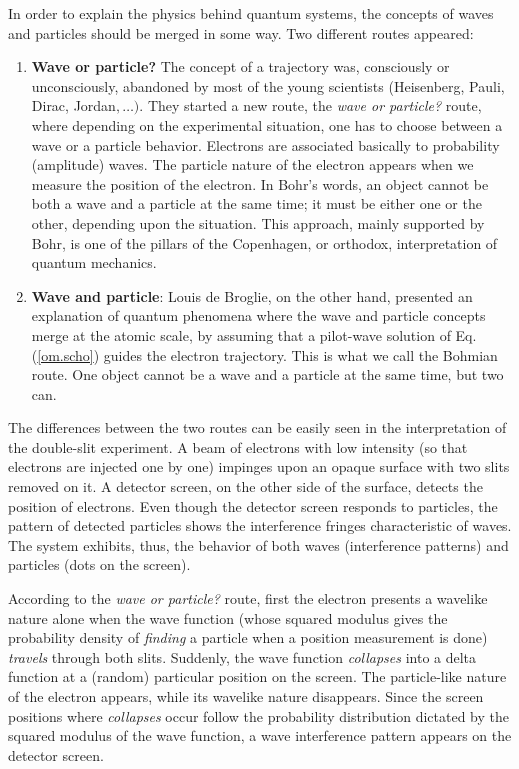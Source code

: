 \documentclass[nofootinbib, secnumarabic, amsmath, nobibnotes,11pt,aps,pra, floatfix]{revtex4-1}
\newcommand{\eref}[1]{Eq. (\ref{#1})}
\begin{document}
In order to  explain the
physics behind quantum systems, the concepts of waves and particles
should be merged in some way. Two different routes appeared:
\begin{enumerate}
\item \textbf{Wave or particle?} The concept of a trajectory was, consciously or unconsciously, abandoned by most of the young scientists (Heisenberg, Pauli, Dirac, Jordan$,\ldots).$ They started a new route, the \textit{wave or particle?} route, where depending on the experimental situation, one has to choose between a wave or a particle behavior. Electrons are associated basically to probability (amplitude) waves. The particle nature of the electron appears when we measure the position of the electron. In Bohr's words, an object cannot be both a wave and a particle at the same time; it must be either one or the other, depending upon the situation. This approach, mainly supported by Bohr, is one of the pillars of the Copenhagen, or orthodox, interpretation of quantum mechanics.

\item \textbf{Wave and particle}: Louis de Broglie, on the other hand, presented an explanation of quantum phenomena where the wave and particle concepts merge at the atomic scale, by assuming that a pilot-wave solution of \eref{om.scho} guides the electron trajectory. This is what we call the Bohmian route. One object cannot be a wave and a particle at the same time, but two can.
\end{enumerate}

The differences between the two routes can be easily seen in the
interpretation of the double-slit experiment. A beam of electrons
with low intensity (so that electrons are injected one by one)
impinges upon an opaque surface with two slits removed on it. A
detector screen, on the other side of the surface, detects the
position of electrons. Even though the detector screen responds to
particles, the pattern of detected particles shows the interference
fringes characteristic of waves. The system exhibits, thus, the
behavior of both waves (interference patterns) and particles (dots
on the screen).

According to the \textit{wave or particle?} route, first the electron presents a wavelike nature alone when the wave function (whose squared modulus gives the probability density of \textit{finding} a particle when a position measurement is done) \textit{travels} through both slits. Suddenly, the wave function \textit{collapses} into a delta function at a (random) particular position on the screen. The particle-like nature of the electron appears, while its wavelike nature disappears. Since the screen positions where \textit{collapses} occur follow the probability distribution dictated by the squared modulus of the wave function, a wave interference pattern appears on the detector screen.
\end{document}
